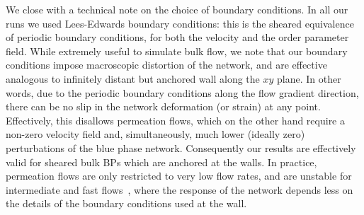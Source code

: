 \documentclass[8.5pt,twoside,twocolumn]{article}
\begin{document}
We close with a technical note on the choice of boundary conditions. 
In all our runs we used Lees-Edwards boundary conditions: this
is the sheared equivalence of periodic boundary conditions, for both the 
velocity and the order parameter field. 
While extremely useful to simulate bulk flow, we
note that our boundary conditions impose macroscopic distortion
of the network, and are effective analogous to infinitely distant
but anchored wall along the $xy$ plane. In other words, due to
the periodic boundary conditions along the flow gradient direction, 
there can be no slip in the network deformation (or strain) at any point. 
Effectively, this disallows permeation flows, which on the other
hand require a non-zero velocity field and, simultaneously,
much lower (ideally zero) perturbations of the blue phase network.
Consequently our results are effectively valid for sheared bulk 
BPs which are anchored at the walls. In practice, permeation flows are 
only restricted to very low flow rates, and are unstable for intermediate 
and fast flows~\cite{Dupuis:2005}, 
where the response of the network depends less on
the details of the boundary conditions used at the wall.
\newpage

\footnotesize{
}
\end{document}
